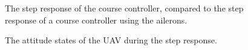 \begin{figure}[]
    \centering
    \caption{The step response of the course controller, compared to the step response of a course controller using the ailerons.}
	\label{fig:ratc_step_course}
\end{figure}

\begin{figure}[]
    \centering
    \caption{The attitude states of the UAV during the step response.}
	\label{fig:ratc_step_states}
\end{figure}

